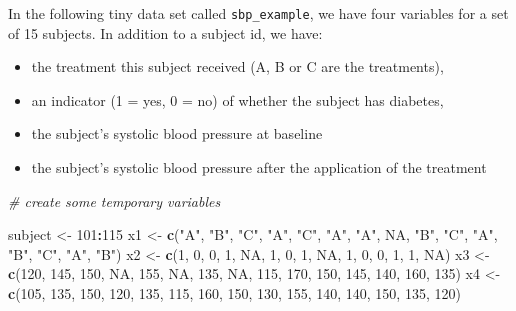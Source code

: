 \documentclass[]{book}
\newenvironment{Shaded}{\begin{snugshade}}{\end{snugshade}}
\newcommand{\KeywordTok}[1]{\textcolor[rgb]{0.13,0.29,0.53}{\textbf{#1}}}
\newcommand{\DecValTok}[1]{\textcolor[rgb]{0.00,0.00,0.81}{#1}}
\newcommand{\StringTok}[1]{\textcolor[rgb]{0.31,0.60,0.02}{#1}}
\newcommand{\CommentTok}[1]{\textcolor[rgb]{0.56,0.35,0.01}{\textit{#1}}}
\newcommand{\OtherTok}[1]{\textcolor[rgb]{0.56,0.35,0.01}{#1}}
\newcommand{\OperatorTok}[1]{\textcolor[rgb]{0.81,0.36,0.00}{\textbf{#1}}}
\newcommand{\NormalTok}[1]{#1}
\providecommand{\tightlist}{%
  \setlength{\itemsep}{0pt}\setlength{\parskip}{0pt}}
\theoremstyle{definition}
\theoremstyle{definition}
\theoremstyle{definition}
\theoremstyle{remark}
\begin{document}
In the following tiny data set called \texttt{sbp\_example}, we have
four variables for a set of 15 subjects. In addition to a subject id, we
have:

\begin{itemize}
\tightlist
\item
  the treatment this subject received (A, B or C are the treatments),
\item
  an indicator (1 = yes, 0 = no) of whether the subject has diabetes,
\item
  the subject's systolic blood pressure at baseline
\item
  the subject's systolic blood pressure after the application of the
  treatment
\end{itemize}

\begin{Shaded}
\begin{Highlighting}[]
\CommentTok{# create some temporary variables}

\NormalTok{subject <-}\StringTok{ }\DecValTok{101}\OperatorTok{:}\DecValTok{115}
\NormalTok{x1 <-}\StringTok{ }\KeywordTok{c}\NormalTok{(}\StringTok{"A"}\NormalTok{, }\StringTok{"B"}\NormalTok{, }\StringTok{"C"}\NormalTok{, }\StringTok{"A"}\NormalTok{, }\StringTok{"C"}\NormalTok{, }\StringTok{"A"}\NormalTok{, }\StringTok{"A"}\NormalTok{, }\OtherTok{NA}\NormalTok{, }\StringTok{"B"}\NormalTok{, }\StringTok{"C"}\NormalTok{, }\StringTok{"A"}\NormalTok{, }\StringTok{"B"}\NormalTok{, }\StringTok{"C"}\NormalTok{, }\StringTok{"A"}\NormalTok{, }\StringTok{"B"}\NormalTok{)}
\NormalTok{x2 <-}\StringTok{ }\KeywordTok{c}\NormalTok{(}\DecValTok{1}\NormalTok{, }\DecValTok{0}\NormalTok{, }\DecValTok{0}\NormalTok{, }\DecValTok{1}\NormalTok{, }\OtherTok{NA}\NormalTok{, }\DecValTok{1}\NormalTok{, }\DecValTok{0}\NormalTok{, }\DecValTok{1}\NormalTok{, }\OtherTok{NA}\NormalTok{, }\DecValTok{1}\NormalTok{, }\DecValTok{0}\NormalTok{, }\DecValTok{0}\NormalTok{, }\DecValTok{1}\NormalTok{, }\DecValTok{1}\NormalTok{, }\OtherTok{NA}\NormalTok{)}
\NormalTok{x3 <-}\StringTok{ }\KeywordTok{c}\NormalTok{(}\DecValTok{120}\NormalTok{, }\DecValTok{145}\NormalTok{, }\DecValTok{150}\NormalTok{, }\OtherTok{NA}\NormalTok{, }\DecValTok{155}\NormalTok{, }\OtherTok{NA}\NormalTok{, }\DecValTok{135}\NormalTok{, }\OtherTok{NA}\NormalTok{, }\DecValTok{115}\NormalTok{, }\DecValTok{170}\NormalTok{, }\DecValTok{150}\NormalTok{, }\DecValTok{145}\NormalTok{, }\DecValTok{140}\NormalTok{, }\DecValTok{160}\NormalTok{, }\DecValTok{135}\NormalTok{)}
\NormalTok{x4 <-}\StringTok{ }\KeywordTok{c}\NormalTok{(}\DecValTok{105}\NormalTok{, }\DecValTok{135}\NormalTok{, }\DecValTok{150}\NormalTok{, }\DecValTok{120}\NormalTok{, }\DecValTok{135}\NormalTok{, }\DecValTok{115}\NormalTok{, }\DecValTok{160}\NormalTok{, }\DecValTok{150}\NormalTok{, }\DecValTok{130}\NormalTok{, }\DecValTok{155}\NormalTok{, }\DecValTok{140}\NormalTok{, }\DecValTok{140}\NormalTok{, }\DecValTok{150}\NormalTok{, }\DecValTok{135}\NormalTok{, }\DecValTok{120}\NormalTok{)}


\end{Highlighting}
\end{Shaded}
\end{document}
